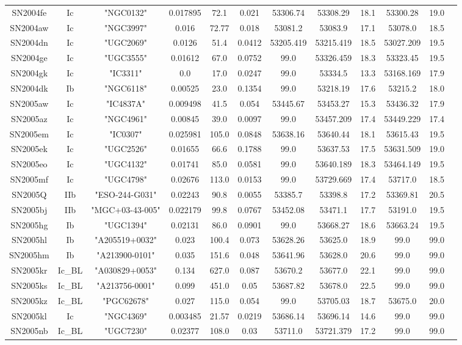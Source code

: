 \begin{table*}
\begin{tabular}{cccccccccccc}
SN2004fe&Ic&"NGC0132"&0.017895&72.1&0.021&53306.74&53308.29&18.1&53300.28&19.0\\ 
SN2004aw&Ic&"NGC3997"&0.016&72.77&0.018&53081.2&53083.9&17.1&53078.0&18.5\\ 
SN2004dn&Ic&"UGC2069"&0.0126&51.4&0.0412&53205.419&53215.419&18.5&53027.209&19.5\\ 
SN2004ge&Ic&"UGC3555"&0.01612&67.0&0.0752&99.0&53326.459&18.3&53323.45&19.5\\ 
SN2004gk&Ic&"IC3311"&0.0&17.0&0.0247&99.0&53334.5&13.3&53168.169&17.9\\ 
SN2004dk&Ib&"NGC6118"&0.00525&23.0&0.1354&99.0&53218.19&17.6&53215.2&18.0\\ 
SN2005aw&Ic&"IC4837A"&0.009498&41.5&0.054&53445.67&53453.27&15.3&53436.32&17.9\\ 
SN2005az&Ic&"NGC4961"&0.00845&39.0&0.0097&99.0&53457.209&17.4&53449.229&17.4\\ 
SN2005em&Ic&"IC0307"&0.025981&105.0&0.0848&53638.16&53640.44&18.1&53615.43&19.5\\ 
SN2005ek&Ic&"UGC2526"&0.01655&66.6&0.1788&99.0&53637.53&17.5&53631.509&19.0\\ 
SN2005eo&Ic&"UGC4132"&0.01741&85.0&0.0581&99.0&53640.189&18.3&53464.149&19.5\\ 
SN2005mf&Ic&"UGC4798"&0.02676&113.0&0.0153&99.0&53729.669&17.4&53717.0&18.5\\ 
SN2005Q&IIb&"ESO-244-G031"&0.02243&90.8&0.0055&53385.7&53398.8&17.2&53369.81&20.5\\ 
SN2005bj&IIb&"MGC+03-43-005"&0.022179&99.8&0.0767&53452.08&53471.1&17.7&53191.0&19.5\\ 
SN2005hg&Ib&"UGC1394"&0.02131&86.0&0.0901&99.0&53668.27&18.6&53663.24&19.5\\ 
SN2005hl&Ib&"A205519+0032"&0.023&100.4&0.073&53628.26&53625.0&18.9&99.0&99.0\\ 
SN2005hm&Ib&"A213900-0101"&0.035&151.6&0.048&53641.96&53628.0&20.6&99.0&99.0\\ 
SN2005kr&Ic_BL&"A030829+0053"&0.134&627.0&0.087&53670.2&53677.0&22.1&99.0&99.0\\ 
SN2005ks&Ic_BL&"A213756-0001"&0.099&451.0&0.05&53687.82&53678.0&22.5&99.0&99.0\\ 
SN2005kz&Ic_BL&"PGC62678"&0.027&115.0&0.054&99.0&53705.03&18.7&53675.0&20.0\\ 
SN2005kl&Ic&"NGC4369"&0.003485&21.57&0.0219&53686.14&53696.14&14.6&99.0&99.0\\ 
SN2005nb&Ic_BL&"UGC7230"&0.02377&108.0&0.03&53711.0&53721.379&17.2&99.0&99.0\\ 

\end{tabular}
\end{table*}

